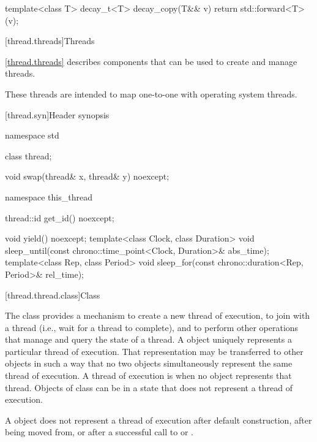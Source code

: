 \begin{codeblock}
template<class T> decay_t<T> decay_copy(T&& v)
  { return std::forward<T>(v); }
\end{codeblock}

[thread.threads]{Threads}

\pnum
\ref{thread.threads} describes components that can be used to create and manage threads.
\begin{note} These threads are intended to map one-to-one with operating system threads.
\end{note}

[thread.syn]{Header  synopsis}
%

\begin{codeblock}
namespace std {
  class thread;

  void swap(thread& x, thread& y) noexcept;

  namespace this_thread {
    thread::id get_id() noexcept;

    void yield() noexcept;
    template<class Clock, class Duration>
      void sleep_until(const chrono::time_point<Clock, Duration>& abs_time);
    template<class Rep, class Period>
      void sleep_for(const chrono::duration<Rep, Period>& rel_time);
  }
}
\end{codeblock}

[thread.thread.class]{Class }

\pnum
The class  provides a mechanism to create a new thread of execution, to join with
a thread (i.e., wait for a thread to complete), and to perform other operations that manage and
query the state of a thread. A  object uniquely represents a particular thread of
execution. That representation may be transferred to other  objects in such a way
that no two  objects simultaneously represent the same thread of execution. A
thread of execution is  when no  object represents that thread.
Objects of class  can be in a state that does not represent a thread of
execution. \begin{note} A  object does not represent a thread of execution after
default construction, after being moved from, or after a successful call to  or
. \end{note}


